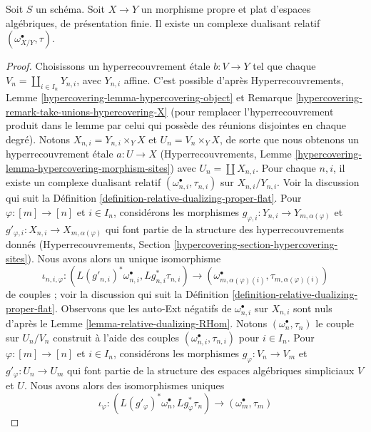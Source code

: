 \begin{lemma}
\label{lemma-existence-relative-dualizing}
Soit $S$ un schéma. Soit $X \to Y$ un morphisme propre et plat
d'espaces algébriques, de présentation finie.
Il existe un complexe dualisant relatif $(\omega_{X/Y}^\bullet, \tau)$.
\end{lemma}

\begin{proof}
Choisissons un hyperrecouvrement \'etale $b : V \to Y$ tel que chaque
$V_n = \coprod_{i \in I_n} Y_{n, i}$, avec $Y_{n, i}$ affine.
C'est possible d'après Hyperrecouvrements, Lemme
\ref{hypercovering-lemma-hypercovering-object} et
Remarque \ref{hypercovering-remark-take-unions-hypercovering-X}
(pour remplacer l'hyperrecouvrement produit
dans le lemme par celui qui possède des réunions disjointes en chaque degré).
Notons $X_{n, i} = Y_{n, i} \times_Y X$ et $U_n = V_n \times_Y X$,
de sorte que nous obtenons un hyperrecouvrement \'etale
$a : U \to X$ (Hyperrecouvrements, Lemme
\ref{hypercovering-lemma-hypercovering-morphism-sites})
avec $U_n = \coprod X_{n, i}$.
Pour chaque $n, i$, il existe un complexe dualisant relatif
$(\omega_{n, i}^\bullet, \tau_{n, i})$ sur $X_{n, i}/Y_{n, i}$.
Voir la discussion qui suit la
Définition \ref{definition-relative-dualizing-proper-flat}.
Pour $\varphi : [m] \to [n]$ et $i \in I_n$, considérons les morphismes
$g_{\varphi, i} : Y_{n, i} \to Y_{m, \alpha(\varphi)}$ et
$g'_{\varphi, i} : X_{n, i} \to X_{m, \alpha(\varphi)}$
qui font partie de la structure des hyperrecouvrements donnés
(Hyperrecouvrements, Section \ref{hypercovering-section-hypercovering-sites}).
Nous avons alors un unique isomorphisme
$$
\iota_{n, i, \varphi} :
(L(g'_{n, i})^*\omega_{n, i}^\bullet, Lg_{n, i}^*\tau_{n, i})
\longrightarrow
(\omega_{m, \alpha(\varphi)(i)}^\bullet, \tau_{m, \alpha(\varphi)(i)})
$$
de couples ; voir la discussion qui suit la
Définition \ref{definition-relative-dualizing-proper-flat}.
Observons que les auto-Ext négatifs de $\omega_{n, i}^\bullet$
sur $X_{n, i}$ sont nuls d'après le Lemme \ref{lemma-relative-dualizing-RHom}.
Notons $(\omega_n^\bullet, \tau_n)$ le couple sur $U_n/V_n$ construit à l'aide
des couples $(\omega_{n, i}^\bullet, \tau_{n, i})$ pour $i \in I_n$.
Pour $\varphi : [m] \to [n]$ et $i \in I_n$, considérons les morphismes
$g_\varphi : V_n \to V_m$ et $g'_\varphi : U_n \to U_m$ qui font partie
de la structure des espaces algébriques simpliciaux $V$ et $U$.
Nous avons alors des isomorphismes uniques
$$
\iota_\varphi :
(L(g'_\varphi)^*\omega_n^\bullet, Lg_\varphi^*\tau_n)
\longrightarrow
(\omega_m^\bullet, \tau_m)
$$
\end{proof}
